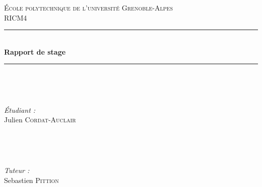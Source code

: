 \documentclass[12pt]{article}
\begin{document}
\begin{titlepage}

\newcommand{\HRule}{\rule{\linewidth}{0.2mm}} %

\center %
 

\textsc{\LARGE École polytechnique de l'université Grenoble-Alpes}\\[1.0cm] %
\textsc{\Large RICM4}\\[1.5cm] %


\HRule \\[0.5cm]
{ \huge \bfseries Rapport de stage}\\[0.2cm] %
\HRule \\[1.5cm]
 

\begin{minipage}{0.47\textwidth}
\begin{flushleft} \large

\

\emph{Étudiant :}\\
Julien \textsc{Cordat-Auclair} %
\end{flushleft}
\end{minipage}
~
\begin{minipage}{0.47\textwidth}
\begin{flushright} \large

\

\emph{Tuteur :}\\
Sebastien \textsc{Pittion} %
\end{flushright}
\end{minipage}\\[3cm]



\end{titlepage}
\end{document}
